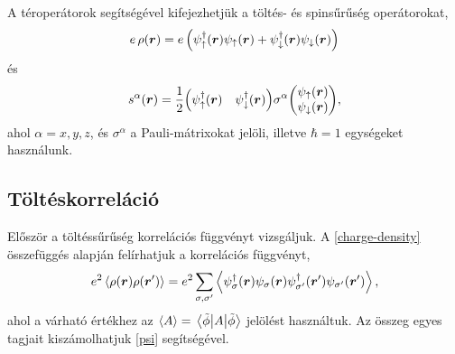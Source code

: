\documentclass[a4paper,12pt,titlepage]{article}
\newcommand{\RR}{{\vb*{r}}}
\begin{document}
A téroperátorok segítségével kifejezhetjük a töltés- és spinsűrűség operátorokat,
\begin{equation} \label{charge-density}
	e \, \rho(\RR) = e \left( \psi_\uparrow^\dagger(\RR) \psi_\uparrow(\RR) + \psi_\downarrow^\dagger(\RR) \psi_\downarrow(\RR) \right)
\end{equation}
és
\begin{equation} \label{spin-density}
	s^\alpha(\RR) = \frac{1}{2} \mqty(\psi_\uparrow^\dagger(\RR) & \psi_\downarrow^\dagger(\RR)) \sigma^\alpha \mqty(\psi_\uparrow(\RR) \\ \psi_\downarrow(\RR)),
\end{equation}
ahol $\alpha = x, y, z$, és $\sigma^\alpha$ a Pauli-mátrixokat jelöli, illetve $\hbar = 1$ egységeket használunk.


\subsection{Töltéskorreláció}

Először a töltéssűrűség korrelációs függvényt vizsgáljuk.  A \eqref{charge-density} összefüggés alapján felírhatjuk a korrelációs függvényt,
\begin{equation}
	e^2 \expval{\rho(\RR) \rho(\RR^\prime)} = e^2 \sum\limits_{\sigma, \sigma^\prime} \expval{\psi_\sigma^\dagger(\RR) \psi_\sigma(\RR) \psi_{\sigma^\prime}^\dagger(\RR^\prime) \psi_{\sigma^\prime}(\RR^\prime)},
\end{equation}
ahol a várható értékhez az $\expval{A} = \matrixelement{\tilde{\phi}}{A}{\tilde{\phi}}$ jelölést használtuk.  Az összeg egyes tagjait kiszámolhatjuk \eqref{psi} segítségével.
\end{document}
